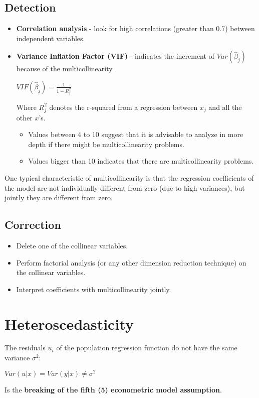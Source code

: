 \documentclass[10pt, a4paper, landscape]{extarticle}
\begin{document}
\begin{multicols}{3}
	\subsection*{Detection}
		\begin{itemize}[leftmargin=*]
			\item \textbf{Correlation analysis} - look for high correlations (greater than 0.7) between independent variables.
			\item \textbf{Variance Inflation Factor (VIF)} - indicates the increment of $Var(\hat{\beta}_j)$ because of the multicollinearity.
			\begin{center}
				$VIF(\hat{\beta}_j) = \frac{1}{1-R_j^2}$
			\end{center}
			Where $R^2_j$ denotes the r-squared from a regression between $x_j$ and all the other $x$'s. 
			\begin{itemize}[leftmargin=*]
				\item Values between 4 to 10 suggest that it is advisable to analyze in more depth if there might be multicollinearity problems.
				\item Values bigger than 10 indicates that there are multicollinearity problems.
			\end{itemize}
		\end{itemize}
		One typical characteristic of multicollinearity is that the regression coefficients of the model are not individually different from zero (due to high variances), but jointly they are different from zero.
	\subsection*{Correction}
		\begin{itemize}[leftmargin=*]
			\item Delete one of the collinear variables.
			\item Perform factorial analysis (or any other dimension reduction technique) on the collinear variables.
			\item Interpret coefficients with multicollinearity jointly.
		\end{itemize}

\columnbreak

\section*{Heteroscedasticity}
	The residuals $u_i$ of the population regression function do not have the same variance $\sigma^2$:
	\begin{center}
		$Var(u|x) = Var(y|x) \neq \sigma^2$
	\end{center}
	Is the \textbf{breaking of the fifth (5) econometric model assumption}.

\end{multicols}
\end{document}
